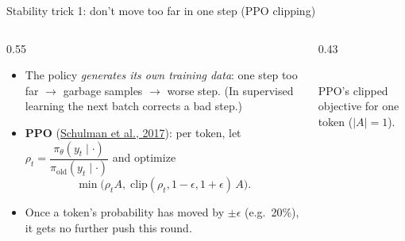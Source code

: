 \begin{frame}{Stability trick 1: don't move too far in one step (PPO clipping)}
\begin{columns}[T]
\begin{column}{0.55\textwidth}
\begin{itemize}\setlength{\itemsep}{6pt}
  \item The policy \emph{generates its own training data}: one step too far $\to$ garbage samples $\to$ worse step. (In supervised learning the next batch corrects a bad step.)
  \item \textbf{PPO} (\href{https://arxiv.org/abs/1707.06347}{Schulman et al., 2017}): per token, let $\rho_t = \dfrac{\pi_\theta(y_t\mid\cdot)}{\pi_{\text{old}}(y_t\mid\cdot)}$ and optimize
  \[ \min\big(\rho_t A,\; \mathrm{clip}(\rho_t, 1-\epsilon, 1+\epsilon)\,A\big). \]
  \item Once a token's probability has moved by $\pm\epsilon$ (e.g.\ 20\%), it gets no further push this round.
\end{itemize}
\end{column}
\begin{column}{0.43\textwidth}
\centering
{}\\
\scriptsize PPO's clipped objective for one token ($|A|=1$).
\end{column}
\end{columns}
\end{frame}

